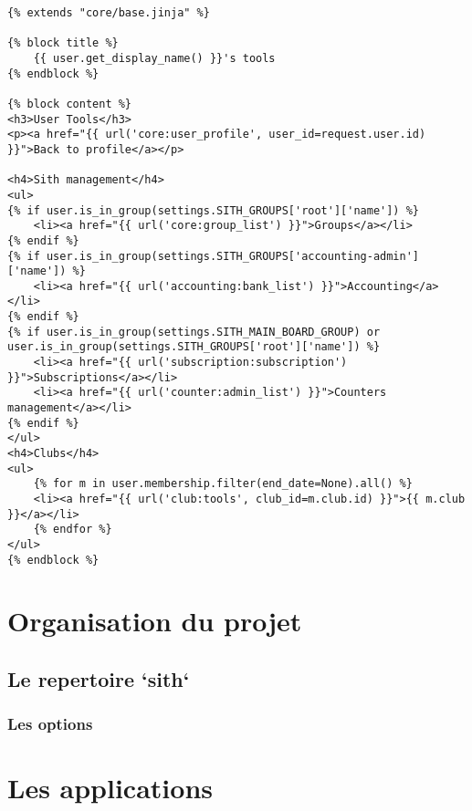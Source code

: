 \documentclass[a4paper]{report}
\begin{document}
\begin{addmargin}[-7em]{0em}
    \begin{verbatim}
{% extends "core/base.jinja" %}

{% block title %}
    {{ user.get_display_name() }}'s tools
{% endblock %}

{% block content %}
<h3>User Tools</h3>
<p><a href="{{ url('core:user_profile', user_id=request.user.id) }}">Back to profile</a></p>

<h4>Sith management</h4>
<ul>
{% if user.is_in_group(settings.SITH_GROUPS['root']['name']) %}
    <li><a href="{{ url('core:group_list') }}">Groups</a></li>
{% endif %}
{% if user.is_in_group(settings.SITH_GROUPS['accounting-admin']['name']) %}
    <li><a href="{{ url('accounting:bank_list') }}">Accounting</a></li>
{% endif %}
{% if user.is_in_group(settings.SITH_MAIN_BOARD_GROUP) or user.is_in_group(settings.SITH_GROUPS['root']['name']) %}
    <li><a href="{{ url('subscription:subscription') }}">Subscriptions</a></li>
    <li><a href="{{ url('counter:admin_list') }}">Counters management</a></li>
{% endif %}
</ul>
<h4>Clubs</h4>
<ul>
    {% for m in user.membership.filter(end_date=None).all() %}
    <li><a href="{{ url('club:tools', club_id=m.club.id) }}">{{ m.club }}</a></li>
    {% endfor %}
</ul>
{% endblock %}
    \end{verbatim}
\end{addmargin}




\chapter{Organisation du projet}
\label{cha:organisation_du_projet}

\section{Le repertoire `sith`}
\label{sec:le_repertoire_sith}

\subsection{Les options}
\label{sub:les_options}


\chapter{Les applications}
\label{cha:les_applications}
\end{document}
